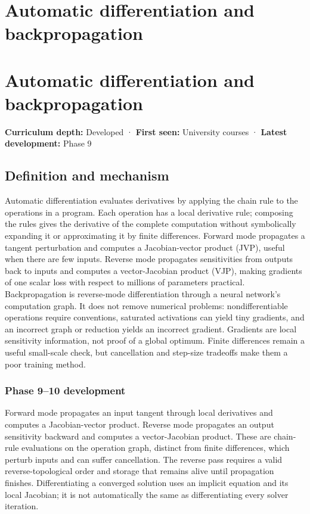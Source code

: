 \hypertarget{appendix-40df0855b4a7}{}
\section*{Automatic differentiation and backpropagation}
\section{Automatic differentiation and backpropagation}\label{appendix-40df0855b4a7-automatic-differentiation-and-backpropagation}

\textbf{Curriculum depth:} Developed · \textbf{First seen:} University courses · \textbf{Latest development:} Phase 9

\subsection{Definition and mechanism}\label{appendix-40df0855b4a7-definition-and-mechanism}

Automatic differentiation evaluates derivatives by applying the chain rule to the operations in a program. Each operation has a local derivative rule; composing the rules gives the derivative of the complete computation without symbolically expanding it or approximating it by finite differences. Forward mode propagates a tangent perturbation and computes a Jacobian-vector product (JVP), useful when there are few inputs. Reverse mode propagates sensitivities from outputs back to inputs and computes a vector-Jacobian product (VJP), making gradients of one scalar loss with respect to millions of parameters practical. Backpropagation is reverse-mode differentiation through a neural network's computation graph. It does not remove numerical problems: nondifferentiable operations require conventions, saturated activations can yield tiny gradients, and an incorrect graph or reduction yields an incorrect gradient. Gradients are local sensitivity information, not proof of a global optimum. Finite differences remain a useful small-scale check, but cancellation and step-size tradeoffs make them a poor training method.

\subsubsection{Phase 9--10 development}\label{appendix-40df0855b4a7-phase-910-development}

Forward mode propagates an input tangent through local derivatives and computes a Jacobian-vector product. Reverse mode propagates an output sensitivity backward and computes a vector-Jacobian product. These are chain-rule evaluations on the operation graph, distinct from finite differences, which perturb inputs and can suffer cancellation. The reverse pass requires a valid reverse-topological order and storage that remains alive until propagation finishes. Differentiating a converged solution uses an implicit equation and its local Jacobian; it is not automatically the same as differentiating every solver iteration.

